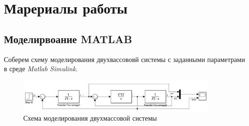 \section{Марериалы работы}

\subsection{Моделирвоание MATLAB}
Соберем схему моделирования двухвассововй системы с заданными параметрами в среде \emph{Matlab Simulink}.
\begin{figure}[!h]
    \centering
    \includegraphics[width=0.9\textwidth]{img/img}
    \caption{Схема моделирования двухмассовой системы}
    \label{fig:dummy}
\end{figure}

